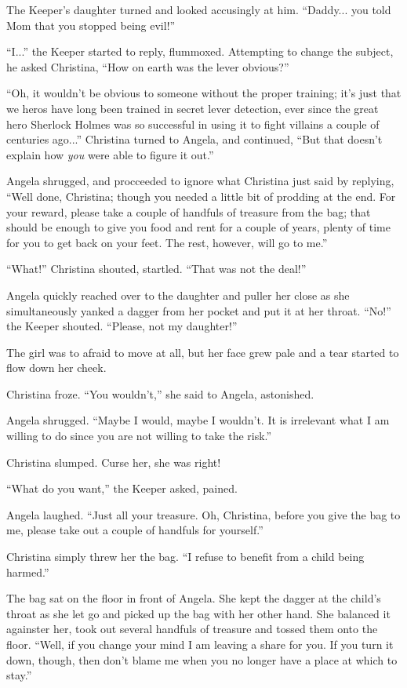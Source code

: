 \documentclass[showtrims,b6paper,draft,10pt]{memoir}
\begin{document}
The Keeper's daughter turned and looked accusingly at him.  ``Daddy... you told Mom that you stopped being evil!''

``I...'' the Keeper started to reply, flummoxed.  Attempting to change the subject, he asked Christina, ``How on earth was the lever obvious?''

``Oh, it wouldn't be obvious to someone without the proper training;  it's just that we heros have long been trained in secret lever detection, ever since the great hero Sherlock Holmes was so successful in using it to fight villains a couple of centuries ago...''  Christina turned to Angela, and continued, ``But that doesn't explain how \emph{you} were able to figure it out.''

Angela shrugged, and procceeded to ignore what Christina just said by replying, ``Well done, Christina;  though you needed a little bit of prodding at the end.  For your reward, please take a couple of handfuls of treasure from the bag;  that should be enough to give you food and rent for a couple of years, plenty of time for you to get back on your feet.  The rest, however, will go to me.''

``What!'' Christina shouted, startled.  ``That was not the deal!''

Angela quickly reached over to the daughter and puller her close as she simultaneously yanked a dagger from her pocket and put it at her throat.  ``No!''  the Keeper shouted.  ``Please, not my daughter!''

The girl was to afraid to move at all, but her face grew pale and a tear started to flow down her cheek.

Christina froze.  ``You wouldn't,'' she said to Angela, astonished.

Angela shrugged.  ``Maybe I would, maybe I wouldn't.  It is irrelevant what I am willing to do since you are not willing to take the risk.''

Christina slumped.  Curse her, she was right!

``What do you want,'' the Keeper asked, pained.

Angela laughed.  ``Just all your treasure.  Oh, Christina, before you give the bag to me, please take out a couple of handfuls for yourself.''

Christina simply threw her the bag.  ``I refuse to benefit from a child being harmed.''

The bag sat on the floor in front of Angela.  She kept the dagger at the child's throat as she let go and picked up the bag with her other hand.  She balanced it againster her, took out several handfuls of treasure and tossed them onto the floor.  ``Well, if you change your mind I am leaving a share for you.  If you turn it down, though, then don't blame me when you no longer have a place at which to stay.''
\end{document}
